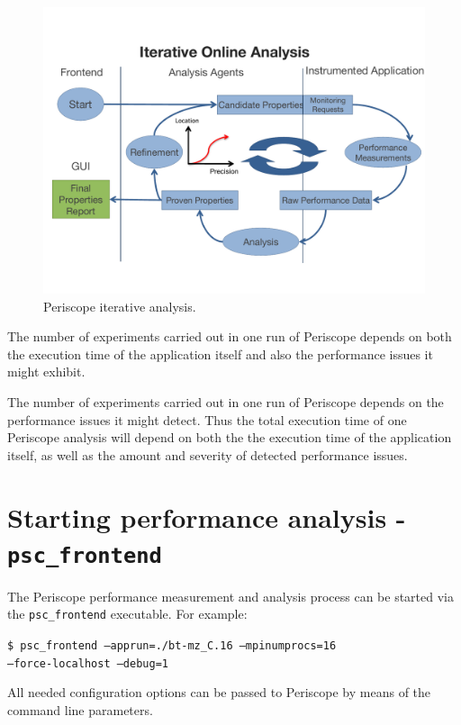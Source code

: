 \documentclass[11pt,oneside,a4paper]{book}
\newenvironment{code}%
{
\addtolength{\leftskip}{0.5cm}}%
{

}
\begin{document}
\begin{figure}[bth]
	\includegraphics[width=\linewidth]{images/Periscope-iterative-analysis-slide}
	\caption{Periscope iterative analysis.}
	\label{fig:analysis-flow}
\end{figure}

The number of experiments carried out in one run of Periscope depends on both the execution time of the application itself and also the performance issues it might exhibit.

The number of experiments carried out in one run of Periscope depends on  the performance issues it might detect. Thus the total execution time of one Periscope analysis will depend on both the the execution time of the application itself, as well as the amount and severity of detected performance issues.


\section{Starting performance analysis - \texttt{psc\_frontend}}
The Periscope performance measurement and analysis process can be started via the \texttt{psc\_frontend} executable. For example:

\begin{code}
\texttt{\$ psc\_frontend --apprun=./bt-mz\_C.16 --mpinumprocs=16 \\--force-localhost --debug=1}
\end{code}

All needed configuration options can be passed to Periscope by means of the command line parameters.
\end{document}
